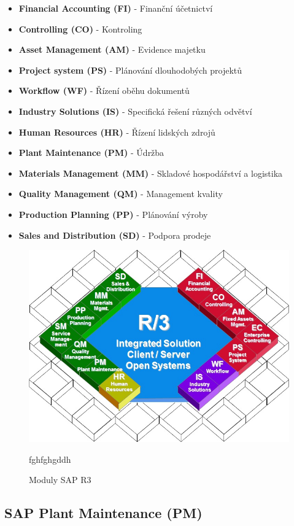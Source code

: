 \documentclass[thesis=M,czech]{FITthesis}[2012/06/26]
\begin{document}
\begin{itemize}
	\item
	\textbf{Financial Accounting (FI)} - Finanční účetnictví 
	\item
	\textbf{Controlling (CO)} - Kontroling
	\item
	\textbf{Asset Management (AM)} - Evidence majetku
	\item
	\textbf{Project system (PS)} - Plánování dlouhodobých projektů
	\item
	\textbf{Workflow (WF)} - Řízení oběhu dokumentů
	\item
	\textbf{Industry Solutions (IS)} - Specifická řešení různých odvětví
	\item
	\textbf{Human Resources (HR)} - Řízení lidských zdrojů  
	\item
	\textbf{Plant Maintenance (PM)} - Údržba
	\item
	\textbf{Materials Management (MM)} - Skladové hospodářství a logistika
	\item
	\textbf{Quality Management (QM)} - Management kvality
	\item
	\textbf{Production Planning (PP)} - Plánování výroby 
	\item
	\textbf{Sales and Distribution (SD)} - Podpora prodeje   
\end{itemize} 	

\begin{figure}[H]
	\centering
	\includegraphics[width=1\textwidth]{images/sap_r3.jpg}
	\caption{Moduly SAP R3}
	\label{img:sapr3}
	\small
	fghfghgddh
\end{figure}

\subsection{SAP Plant Maintenance (PM)}
\end{document}
